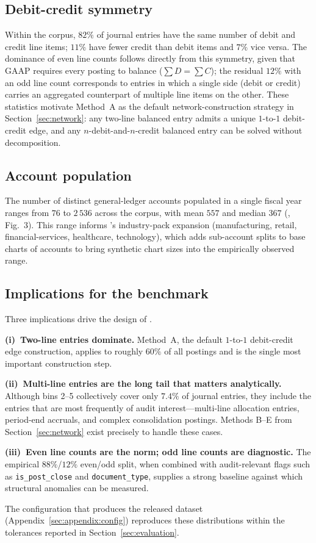 \subsection{Debit-credit symmetry}
\label{sec:empirical:symmetry}

Within the corpus, $82\%$ of journal entries have the same number
of debit and credit line items; $11\%$ have fewer credit than debit
items and $7\%$ vice versa.  The dominance of even line counts
follows directly from this symmetry, given that GAAP requires every
posting to balance ($\sum D = \sum C$); the residual $12\%$ with an
odd line count corresponds to entries in which a single side
(debit or credit) carries an aggregated counterpart of multiple
line items on the other.  These statistics motivate Method~A as the
default network-construction strategy in
Section~\ref{sec:network}: any two-line balanced entry admits a
unique $1$-to-$1$ debit-credit edge, and any
$n$-debit-and-$n$-credit balanced entry can be solved without
decomposition.

\subsection{Account population}
\label{sec:empirical:accounts}

The number of distinct general-ledger accounts populated in a single
fiscal year ranges from $76$ to $2\,536$ across the corpus, with
mean $557$ and median $367$
(\citealt{ivertowski2024apn}, Fig.~3).  This range informs
\system{}'s industry-pack expansion (manufacturing, retail,
financial-services, healthcare, technology), which adds sub-account
splits to base charts of accounts to bring synthetic chart sizes into
the empirically observed range.

\subsection{Implications for the benchmark}
\label{sec:empirical:implications}

Three implications drive the design of \bench{}.

\textbf{(i)~Two-line entries dominate.}  Method~A, the default
$1$-to-$1$ debit-credit edge construction, applies to roughly
$60\%$ of all postings and is the single most important
construction step.

\textbf{(ii)~Multi-line entries are the long tail that matters
analytically.}  Although bins 2--5 collectively cover only $7.4\%$
of journal entries, they include the entries that are most
frequently of audit interest---multi-line allocation entries,
period-end accruals, and complex consolidation postings.  Methods
B--E from Section~\ref{sec:network} exist precisely to handle these
cases.

\textbf{(iii)~Even line counts are the norm; odd line counts are
diagnostic.}  The empirical $88\%$/$12\%$ even/odd split, when
combined with audit-relevant flags such as \texttt{is\_post\_close}
and \texttt{document\_type}, supplies a strong baseline against
which structural anomalies can be measured.

The configuration that produces the released \bench{} dataset
(Appendix~\ref{sec:appendix:config}) reproduces these distributions
within the tolerances reported in Section~\ref{sec:evaluation}.
